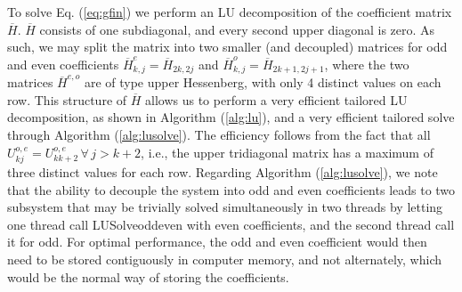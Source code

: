 \documentclass[11pt, oneside]{article}
\newcommand{\D}[1]{\overline{#1}}
\begin{document}
To solve Eq. (\ref{eq:gfin}) we perform an LU decomposition of the coefficient 
matrix $\D{H}$. $\D{H}$ consists of one subdiagonal, and every 
second upper diagonal is zero. As such, we may split the matrix into two 
smaller (and decoupled) matrices for odd and even coefficients $\D{H}^e_{k,j} = 
\D{H}_{2k,2j}$ and $\D{H}^o_{k,j} = \D{H}_{2k+1,2j+1}$, where the two matrices 
$\D{H}^{e,o}$ are of type upper 
Hessenberg, with only 4 distinct values on each row. This structure of $\D{H}$ 
allows us to perform a very efficient tailored LU decomposition, as shown in 
Algorithm (\ref{alg:lu}), and a very efficient tailored solve through 
Algorithm (\ref{alg:lusolve}). The efficiency follows from the fact that all 
$U^{o,e}_{kj} = U^{o,e}_{kk+2} \, \forall \, j > k+2$, i.e., the upper 
tridiagonal matrix has a maximum of three distinct values for each row. 
Regarding Algorithm 
(\ref{alg:lusolve}), we note that the ability to decouple the system into odd 
and even coefficients leads to two subsystem that may be trivially solved 
simultaneously in two threads by letting one thread call LUSolveoddeven with 
even coefficients, and the second thread call it for odd. For optimal 
performance, the odd and even coefficient would then need to be stored 
contiguously in computer memory, and not alternately, which would be the normal 
way of storing the coefficients.
\end{document}
